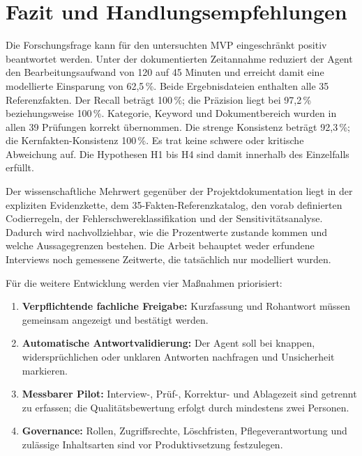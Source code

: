 \documentclass[
  10pt,
  ngerman,
  a4paper,
  toc=graduated,
  numbers=noenddot,
  headings=standardclasses
]{scrartcl}
\newcommand{\pct}[1]{#1\,\%}
\begin{document}
\newpage
\section{Fazit und Handlungsempfehlungen}

Die Forschungsfrage kann für den untersuchten MVP eingeschränkt positiv beantwortet werden. Unter der dokumentierten Zeitannahme reduziert der Agent den Bearbeitungsaufwand von 120 auf 45 Minuten und erreicht damit eine modellierte Einsparung von \pct{62{,}5}. Beide Ergebnisdateien enthalten alle 35 Referenzfakten. Der Recall beträgt \pct{100}; die Präzision liegt bei \pct{97{,}2} beziehungsweise \pct{100}. Kategorie, Keyword und Dokumentbereich wurden in allen 39 Prüfungen korrekt übernommen. Die strenge Konsistenz beträgt \pct{92{,}3}; die Kernfakten-Konsistenz \pct{100}. Es trat keine schwere oder kritische Abweichung auf. Die Hypothesen H1 bis H4 sind damit innerhalb des Einzelfalls erfüllt.

Der wissenschaftliche Mehrwert gegenüber der Projektdokumentation liegt in der expliziten Evidenzkette, dem 35-Fakten-Referenzkatalog, den vorab definierten Codierregeln, der Fehlerschwereklassifikation und der Sensitivitätsanalyse. Dadurch wird nachvollziehbar, wie die Prozentwerte zustande kommen und welche Aussagegrenzen bestehen. Die Arbeit behauptet weder erfundene Interviews noch gemessene Zeitwerte, die tatsächlich nur modelliert wurden.

Für die weitere Entwicklung werden vier Maßnahmen priorisiert:

\begin{enumerate}
  \item \textbf{Verpflichtende fachliche Freigabe:} Kurzfassung und Rohantwort müssen gemeinsam angezeigt und bestätigt werden.
  \item \textbf{Automatische Antwortvalidierung:} Der Agent soll bei knappen, widersprüchlichen oder unklaren Antworten nachfragen und Unsicherheit markieren.
  \item \textbf{Messbarer Pilot:} Interview-, Prüf-, Korrektur- und Ablagezeit sind getrennt zu erfassen; die Qualitätsbewertung erfolgt durch mindestens zwei Personen.
  \item \textbf{Governance:} Rollen, Zugriffsrechte, Löschfristen, Pflegeverantwortung und zulässige Inhaltsarten sind vor Produktivsetzung festzulegen.
\end{enumerate}
\end{document}

